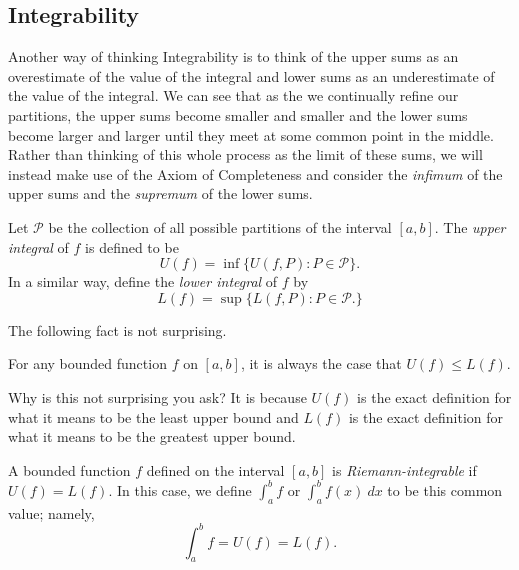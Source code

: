 \subsection{Integrability}

Another way of thinking Integrability is to think of the upper sums as an overestimate of the value of the integral and lower sums as an underestimate of the value of the integral. We can see that as the we continually refine our partitions, the upper sums become smaller and smaller and the lower sums become larger and larger until they meet at some common point in the middle. 
	Rather than thinking of this whole process as the limit of these sums, we will instead make use of the Axiom of Completeness and consider the \textit{infimum} of the upper sums and the \textit{supremum} of the lower sums.

\begin{tcolorbox}
\begin{defn}
	Let \( \mathcal{P}  \) be the collection of all possible partitions of the interval \( [a,b] \). The \textit{upper integral} of \( f \) is defined to be 
	\[  U(f) = \inf \{ U(f,P) : P \in \mathcal{P} \}.  \]
	In a similar way, define the \textit{lower integral} of \( f  \) by 
	\[  L(f) = \sup \{ L(f,P) : P \in \mathcal{P}. \}  \]
\end{defn}
\end{tcolorbox}
 The following fact is not surprising. 
\begin{tcolorbox}
\begin{lem}
	For any bounded function \( f  \) on \( [a,b]  \), it is always the case that \( U(f) \leq L(f) \).
\end{lem}
\end{tcolorbox}
Why is this not surprising you ask? It is because \( U(f) \) is the exact definition for what it means to be the least upper bound and \( L(f)  \) is the exact definition for what it means to be the greatest upper bound.

\begin{tcolorbox}
	\begin{defn}
	A bounded function \( f  \) defined on the interval \( [a,b] \) is \textit{Riemann-integrable} if \( U(f) = L(f) \). In this case, we define \( \int_{ a }^{ b } f   \) or \( \int_{ a }^{ b } f(x) \ dx \) to be this common value; namely, 
	\[  \int_{ a }^{ b } f  = U(f) = L(f). \]
	\end{defn}
\end{tcolorbox}

